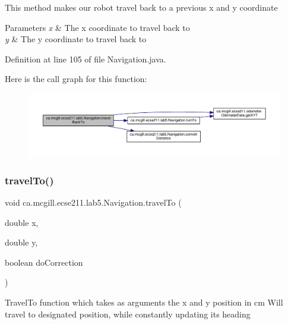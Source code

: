 This method makes our robot travel back to a previous x and y coordinate


\begin{DoxyParams}{Parameters}
{\em x} & The x coordinate to travel back to \\
\hline
{\em y} & The y coordinate to travel back to \\
\hline
\end{DoxyParams}


Definition at line 105 of file Navigation.\+java.

Here is the call graph for this function\+:
\nopagebreak
\begin{figure}[H]
\begin{center}
\leavevmode
\includegraphics[width=350pt]{classca_1_1mcgill_1_1ecse211_1_1lab5_1_1_navigation_aacb83ee18419dcd6095e331975cf2167_cgraph}
\end{center}
\end{figure}
\mbox{\label{classca_1_1mcgill_1_1ecse211_1_1lab5_1_1_navigation_a318969f4776d0bf4a8721be3d2444a5c}} 
\subsubsection{\texorpdfstring{travel\+To()}{travelTo()}}
{\footnotesize\ttfamily void ca.\+mcgill.\+ecse211.\+lab5.\+Navigation.\+travel\+To (\begin{DoxyParamCaption}\item[{double}]{x,  }\item[{double}]{y,  }\item[{boolean}]{do\+Correction }\end{DoxyParamCaption})}

Travel\+To function which takes as arguments the x and y position in cm Will travel to designated position, while constantly updating it\textquotesingle{}s heading

